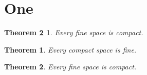 \documentclass{article}
\newtheorem{thm}{Theorem}[section]
\begin{document}
\section{One}
\newtheorem*{again}{Theorem \ref{thm:main}}
\begin{again} Every fine space is compact. \end{again}
\begin{thm} Every compact space is fine. \end{thm}
\begin{thm}\label{thm:main} Every fine space is compact. \end{thm}
\end{document}
